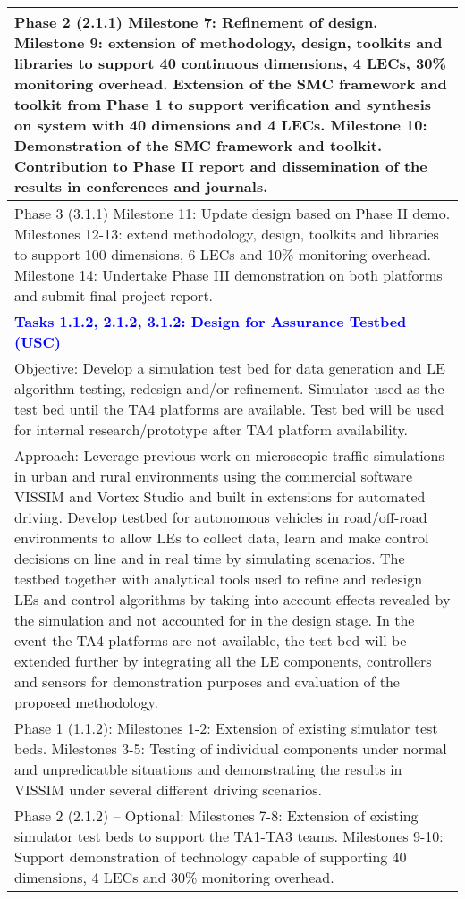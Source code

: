 {\begin{longtable} {|p{\textwidth} | }
Phase 2 (2.1.1) Milestone 7: Refinement of design.  Milestone 9: extension of methodology, design, toolkits and libraries to support 40 continuous dimensions, 4 LECs, 30\% monitoring overhead. Extension of the SMC framework and toolkit from Phase 1 to support verification and synthesis on system with 40 dimensions and 4 LECs.  Milestone 10: Demonstration of the SMC framework and toolkit.  Contribution to Phase II report and dissemination of the results in conferences and journals. \\ \hline
Phase 3 (3.1.1) Milestone 11: Update design based on Phase II demo.  Milestones 12-13:  extend methodology, design, toolkits and libraries to support 100 dimensions, 6 LECs and 10\% monitoring overhead.   Milestone 14: Undertake Phase III demonstration on both platforms and submit final project report. \\ \hline
\textcolor{blue} {\footnotesize {\textbf{Tasks 1.1.2, 2.1.2, 3.1.2: Design for Assurance Testbed (USC)} }}\\ \hline
Objective:  Develop a simulation test bed for data generation and LE algorithm testing, redesign and/or refinement.   Simulator used as the test bed until the TA4 platforms are available.   Test bed will be used for internal research/prototype after TA4 platform availability. \\ \hline
Approach:  Leverage previous work on microscopic traffic simulations in urban and rural environments using the commercial software VISSIM and Vortex Studio and built in extensions for automated driving.   Develop testbed for autonomous vehicles in road/off-road environments to allow LEs to collect data, learn and make control decisions on line and in real time by simulating scenarios. The testbed together with analytical tools used to refine and redesign LEs and control algorithms by taking into account effects revealed by the simulation and not accounted for in the design stage.    In the event the TA4 platforms are not available, the test bed will be extended further by integrating all the LE components, controllers and sensors for demonstration purposes and evaluation of the proposed methodology. \\ \hline
Phase 1 (1.1.2):  Milestones 1-2:  Extension of existing simulator test beds.  Milestones 3-5:  Testing of individual components under normal and unpredicatble situations and demonstrating the results in VISSIM under several different driving scenarios. \\ \hline
Phase 2 (2.1.2) – Optional:  Milestones 7-8:  Extension of existing simulator test beds to support the TA1-TA3 teams.  Milestones 9-10:  Support demonstration of technology capable of supporting 40 dimensions, 4 LECs and 30\% monitoring overhead. \\ \hline

\end{longtable}}
